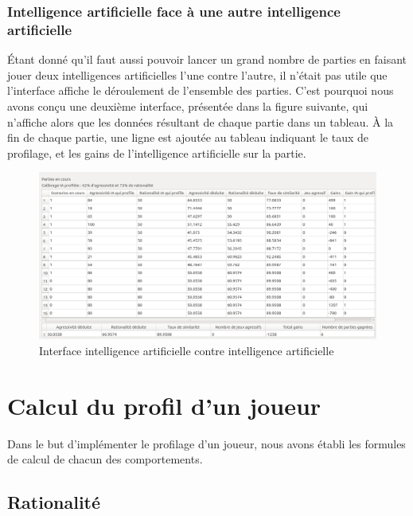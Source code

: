 \documentclass{report}
\begin{document}
\subsection{Intelligence artificielle face à une autre intelligence artificielle}

\hspace{0.5cm}Étant donné qu'il faut aussi pouvoir lancer un grand nombre de parties en faisant jouer deux intelligences artificielles l'une contre l'autre, il n'était pas utile que l'interface affiche le déroulement de l'ensemble des parties. C'est pourquoi nous avons conçu une deuxième interface, présentée dans la figure suivante, qui n'affiche alors que les données résultant de chaque partie dans un tableau. À la fin de chaque partie, une ligne est ajoutée au tableau indiquant le taux de profilage, et les gains de l'intelligence artificielle sur la partie.\\

\begin{figure}[H]
\hspace{-0.5cm}
		\includegraphics[scale=0.3]{./imagesRapport/interfaceGraphiqueIA.png}
	\caption[Interface intelligence artificielle contre intelligence artificielle]{Interface intelligence artificielle contre intelligence artificielle}
\end{figure}

\chapter{Calcul du profil d'un joueur}


\hspace{0.5cm}Dans le but d'implémenter le profilage d'un joueur, nous avons établi les formules de calcul de chacun des comportements. \par

\section{Rationalité}
\end{document}
